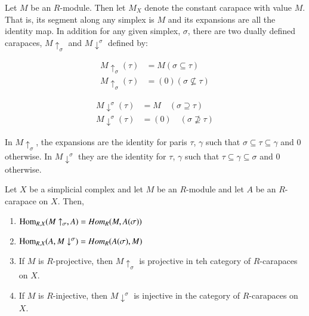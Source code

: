 Let $M$ be an $R$-module. Then let $M_{X}$ denote the constant carapace with value $M$. That is, its segment along any simplex is $M$ and its expansions are all the identity map. In addition for any given simplex, $\sigma$, there are two dually defined carapaces, $M \uparrow_{\sigma}$ and $M \downarrow^{\sigma}$ defined by:

\begin{equation}
\begin{aligned}\label{art6-eq-1.2}
M \uparrow_{\sigma} (\tau) &= M(\sigma \subseteq \tau)\\
M \uparrow_{\sigma} (\tau) &= (0)(\sigma \nsubseteq \tau)
\end{aligned}
\end{equation}

\begin{equation}
\begin{aligned}\label{art6-eq-1.3}
M \downarrow^{\sigma} (\tau) &= M\quad(\sigma \supseteq \tau)\\
M \downarrow^{\sigma} (\tau) &= (0)\quad(\sigma \nsupseteq \tau)
\end{aligned}
\end{equation}

 In $M \uparrow_{\sigma}$, the expansions are the identity for paris $\tau$, $\gamma$ such that $\sigma \subseteq \tau \subseteq \gamma$ and 0 otherwise. In $M \downarrow^{\sigma}$ they are the identity for $\tau$, $\gamma$ such that $\tau \subseteq \gamma \subseteq \sigma$ and 0 otherwise.

\begin{lem}\label{art6-lemma-1.4}
Let $X$ be a simplicial complex and let $M$ be an $R$-module and let $A$ be an $R$-carapace on $X$. Then,
\begin{enumerate}[1.]
\item $\operatorname{Hom}_{R, X}(M \uparrow_{\sigma}, A) = Hom_{R}(M, A(\sigma))$\label{art6-enum-lemma1.4-(1)}
\item $\operatorname{Hom}_{R, X}(A , M \downarrow^{\sigma}) = Hom_{R}( A(\sigma), M)$\label{art6-enum-lemma1.4-(2)}
\item If $M$ is $R$-projective, then $M \uparrow_{\sigma}$ is projective in teh category of $R$-carapaces on $X$.\label{art6-enum-lemma1.4-(3)}
\item If $M$ is $R$-injective, then $M \downarrow^{\sigma}$ is injective in the category of $R$-carapaces on $X$.\label{art6-enum-lemma1.4-(4)}
\end{enumerate}
\end{lem}

